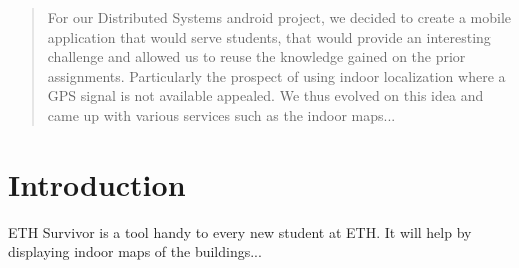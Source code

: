 \begin{abstract}
	For our Distributed Systems android project, we decided to create a mobile application that would serve students, that would provide an interesting challenge and allowed us to reuse the knowledge gained on the prior assignments. Particularly the prospect of using indoor localization where a GPS signal is not available appealed. We thus evolved on this idea and came up with various services such as the indoor maps...
\end{abstract}

\section{Introduction}
	ETH Survivor is a tool handy to every new student at ETH. It will help by displaying indoor maps of the buildings...
